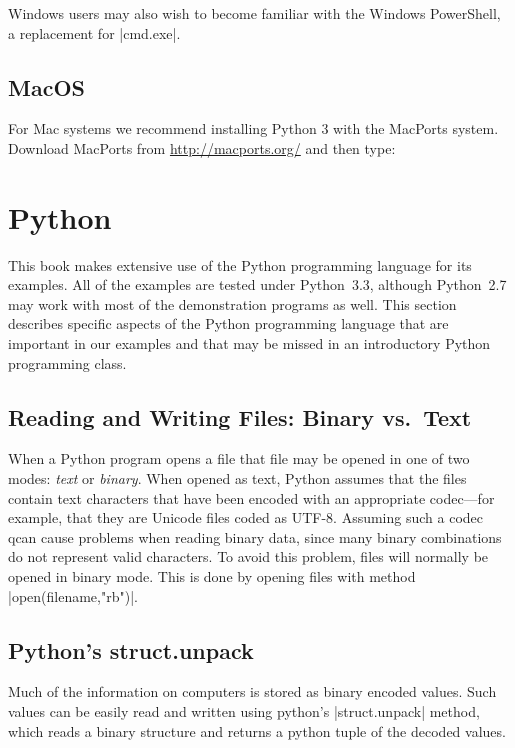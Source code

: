 Windows users may also wish to become familiar with the Windows
PowerShell, a replacement for |cmd.exe|.


\subsection{MacOS}

For Mac systems we recommend installing Python 3 with the MacPorts
system. Download MacPorts from \url{http://macports.org/} and then type:




\section{Python}
This book makes extensive use of the Python programming language for
its examples. All of the examples are tested under Python~3.3,
although Python~2.7 may work with most of the demonstration programs
as well.  This section describes specific aspects of the Python
programming language that are important in our examples and that may
be missed in an introductory Python programming class.

\subsection{Reading and Writing Files: Binary vs.\ Text}

When a Python program opens a file that file may be opened in one of
two modes: \emph{text} or \emph{binary}.  When opened as text, Python
assumes that the files contain text characters that have been encoded
with an appropriate codec---for example, that they are Unicode files
coded as UTF-8. Assuming such a codec qcan cause problems when reading
binary data, since many binary combinations do not represent valid
characters. To avoid this problem, files will normally be opened in
binary mode. This is done by opening files with method
|open(filename,"rb")|.

\subsection{Python's struct.unpack}
Much of the information on computers is stored as binary encoded
values. Such values can be easily read and written using python's
|struct.unpack| method, which reads a binary structure and returns a
python tuple of the decoded values.  

